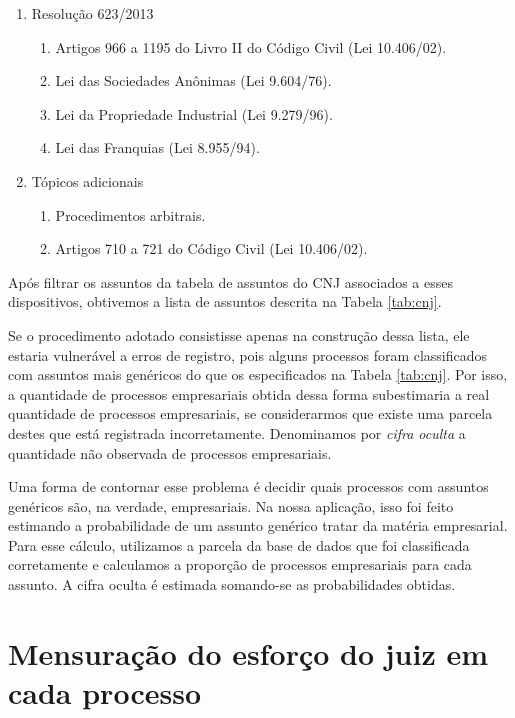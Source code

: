 \documentclass[]{book}
\providecommand{\tightlist}{%
  \setlength{\itemsep}{0pt}\setlength{\parskip}{0pt}}
\begin{document}
\begin{enumerate}
\def\labelenumi{\arabic{enumi}.}
\tightlist
\item
  Resolução 623/2013

  \begin{enumerate}
  \def\labelenumii{\arabic{enumii}.}
  \tightlist
  \item
    Artigos 966 a 1195 do Livro II do Código Civil (Lei 10.406/02).
  \item
    Lei das Sociedades Anônimas (Lei 9.604/76).
  \item
    Lei da Propriedade Industrial (Lei 9.279/96).
  \item
    Lei das Franquias (Lei 8.955/94).
  \end{enumerate}
\item
  Tópicos adicionais

  \begin{enumerate}
  \def\labelenumii{\arabic{enumii}.}
  \tightlist
  \item
    Procedimentos arbitrais.
  \item
    Artigos 710 a 721 do Código Civil (Lei 10.406/02).
  \end{enumerate}
\end{enumerate}

Após filtrar os assuntos da tabela de assuntos do CNJ associados a esses
dispositivos, obtivemos a lista de assuntos descrita na Tabela
\ref{tab:cnj}.

Se o procedimento adotado consistisse apenas na construção dessa lista,
ele estaria vulnerável a erros de registro, pois alguns processos foram
classificados com assuntos mais genéricos do que os especificados na
Tabela \ref{tab:cnj}. Por isso, a quantidade de processos empresariais
obtida dessa forma subestimaria a real quantidade de processos
empresariais, se considerarmos que existe uma parcela destes que está
registrada incorretamente. Denominamos por \emph{cifra oculta} a
quantidade não observada de processos empresariais.

Uma forma de contornar esse problema é decidir quais processos com
assuntos genéricos são, na verdade, empresariais. Na nossa aplicação,
isso foi feito estimando a probabilidade de um assunto genérico tratar
da matéria empresarial. Para esse cálculo, utilizamos a parcela da base
de dados que foi classificada corretamente e calculamos a proporção de
processos empresariais para cada assunto. A cifra oculta é estimada
somando-se as probabilidades obtidas.

\section{Mensuração do esforço do juiz em cada
processo}\label{metotempos}
\end{document}
